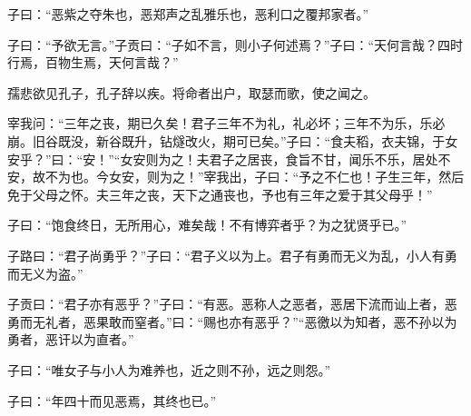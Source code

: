 \documentclass[12pt,a4paper]{ctexbook}
\begin{document}
子曰：“恶紫之夺朱也，恶郑声之乱雅乐也，恶利口之覆邦家者。”\par
子曰：“予欲无言。”子贡曰：“子如不言，则小子何述焉？”子曰：“天何言哉？四时行焉，百物生焉，天何言哉？”\par
孺悲欲见孔子，孔子辞以疾。将命者出户，取瑟而歌，使之闻之。\par
宰我问：“三年之丧，期已久矣！君子三年不为礼，礼必坏；三年不为乐，乐必崩。旧谷既没，新谷既升，钻燧改火，期可已矣。”子曰：“食夫稻，衣夫锦，于女安乎？”曰：“安！”“女安则为之！夫君子之居丧，食旨不甘，闻乐不乐，居处不安，故不为也。今女安，则为之！”宰我出，子曰：“予之不仁也！子生三年，然后免于父母之怀。夫三年之丧，天下之通丧也，予也有三年之爱于其父母乎！”\par
子曰：“饱食终日，无所用心，难矣哉！不有博弈者乎？为之犹贤乎已。”\par
子路曰：“君子尚勇乎？”子曰：“君子义以为上。君子有勇而无义为乱，小人有勇而无义为盗。”\par
子贡曰：“君子亦有恶乎？”子曰：“有恶。恶称人之恶者，恶居下流而讪上者，恶勇而无礼者，恶果敢而窒者。”曰：“赐也亦有恶乎？”“恶徼以为知者，恶不孙以为勇者，恶讦以为直者。”\par
子曰：“唯女子与小人为难养也，近之则不孙，远之则怨。”\par
子曰：“年四十而见恶焉，其终也已。”\par
\end{document}
